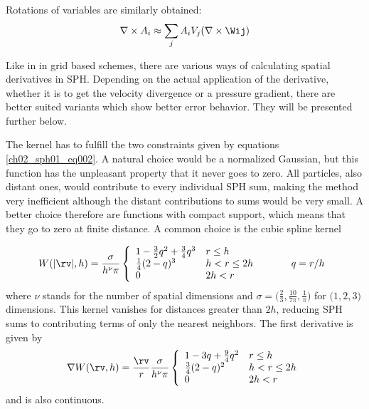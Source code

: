 Rotations of variables are similarly obtained:
\begin{equation}
\label{ch02_sph01_eq006}
\nabla \times A_i \approx \sum_{j} A_i V_{j} (\nabla \times \Wij)
\end{equation}

Like in in grid based schemes, there are various ways of calculating spatial derivatives in SPH.
Depending on the actual application of the derivative, whether it is to get the velocity divergence or a pressure gradient, there are better suited variants which show better error behavior. They will be presented further below.

The kernel has to fulfill the two constraints given by equations \ref{ch02_sph01_eq002}. A natural choice would be a normalized Gaussian, but this function has the unpleasant property that it never goes to zero. All particles, also distant ones, would contribute to every individual SPH sum, making the method very inefficient although the distant contributions to sums would be very small. A better choice therefore are functions with compact support, which means that they go to zero at finite distance. A common choice is the cubic spline kernel

\begin{equation}
\label{ch02_sph01_eq007}
W(| \rv |, h) = \frac{\sigma}{h^\nu \pi} \left \{ \begin{array}{lll}
1 - \frac{3}{2}q^2 + \frac{3}{4}q^3 & r \leq h & \\
\frac{1}{4}(2-q)^3 & h < r  \leq 2h & \hspace{1.0cm} q = r / h\\
0 & 2h < r & \\
\end{array} \right. 
\end{equation}
where $\nu$ stands for the number of spatial dimensions and $\sigma = \big( \frac{2}{3}, \frac{10}{7\pi}, \frac{1}{\pi} \big) $ for $\big( 1,2,3\big)$ dimensions. This kernel vanishes for distances greater than $2h$, reducing SPH sums to contributing terms of only the nearest neighbors. The first derivative is given by 
\begin{equation}
\label{ch02_sph01_eq008}
\nabla W(\rv, h) = \frac{\rv}{r} \frac{\sigma}{h^\nu \pi} \left \{ \begin{array}{ll}
1 - 3q + \frac{9}{4}q^2 & r \leq h \\
\frac{3}{4}(2-q)^2 & h < r  \leq 2h \\
0 & 2h < r \\
\end{array} \right. 
\end{equation}
and is also continuous. 

